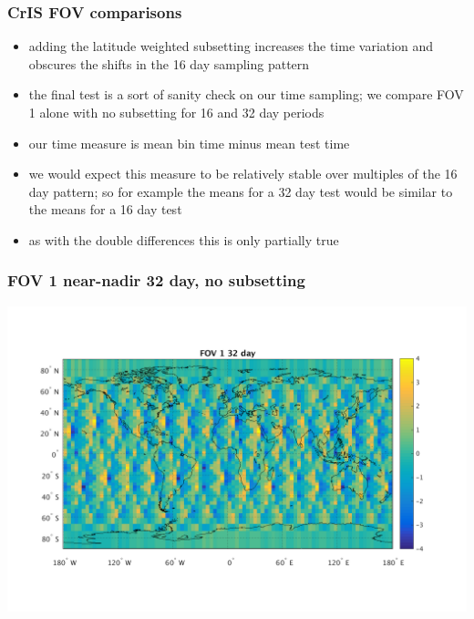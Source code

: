 \documentclass[11pt]{beamer}
\begin{document}
\begin{frame}
\frametitle{CrIS FOV comparisons}

\begin{itemize}

  \item adding the latitude weighted subsetting increases the time
    variation and obscures the shifts in the 16 day sampling pattern

  \item the final test is a sort of sanity check on our time
    sampling; we compare FOV 1 alone with no subsetting for 16 and
    32 day periods

  \item our time measure is mean bin time minus mean test time

  \item we would expect this measure to be relatively stable over
    multiples of the 16 day pattern; so for example the means for a
    32 day test would be similar to the means for a 16 day test

  \item as with the double differences this is only partially true

\end{itemize}

\end{frame}
\begin{frame}
\frametitle{FOV 1 near-nadir 32 day, no subsetting}
\begin{center}
  \includegraphics[scale=0.5]{slackfigs/FOV_1_32_day_near_nosub.png}
\end{center}
\end{frame}
\end{document}
